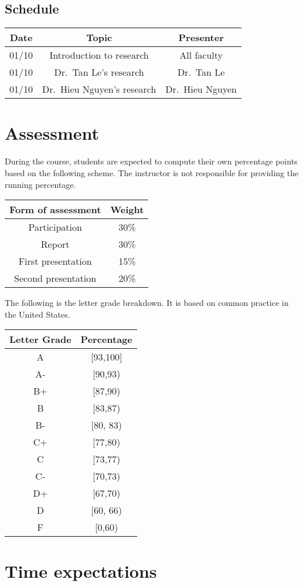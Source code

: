 \documentclass[
  openany]{book}
\begin{document}
\hypertarget{schedule}{%
\subsection*{Schedule}\label{schedule}}

\begin{longtable}[]{@{}ccc@{}}
\toprule
Date & Topic & Presenter\tabularnewline
\midrule
\endhead
01/10 & Introduction to research & All faculty\tabularnewline
01/10 & Dr.~Tan Le's research & Dr.~Tan Le\tabularnewline
01/10 & Dr.~Hieu Nguyen's research & Dr.~Hieu Nguyen\tabularnewline
\bottomrule
\end{longtable}

\hypertarget{assessment}{%
\section*{Assessment}\label{assessment}}

During the course, students are expected to compute their own percentage
points based on the following scheme.
The instructor is not responsible for providing the running percentage.

\begin{longtable}[]{@{}cc@{}}
\toprule
\textbf{Form of assessment} & \textbf{Weight}\tabularnewline
\midrule
\endhead
Participation & 30\%\tabularnewline
Report & 30\%\tabularnewline
First presentation & 15\%\tabularnewline
Second presentation & 20\%\tabularnewline
\bottomrule
\end{longtable}

The following is the letter grade breakdown. It is based on
common practice in the United States.

\begin{longtable}[]{@{}cc@{}}
\toprule
\textbf{Letter Grade} & \textbf{Percentage}\tabularnewline
\midrule
\endhead
A & {[}93,100{]}\tabularnewline
A- & {[}90,93)\tabularnewline
B+ & {[}87,90)\tabularnewline
B & {[}83,87)\tabularnewline
B- & {[}80, 83)\tabularnewline
C+ & {[}77,80)\tabularnewline
C & {[}73,77)\tabularnewline
C- & {[}70,73)\tabularnewline
D+ & {[}67,70)\tabularnewline
D & {[}60, 66)\tabularnewline
F & {[}0,60)\tabularnewline
\bottomrule
\end{longtable}

\hypertarget{time-expectations}{%
\section*{Time expectations}\label{time-expectations}}
\end{document}
